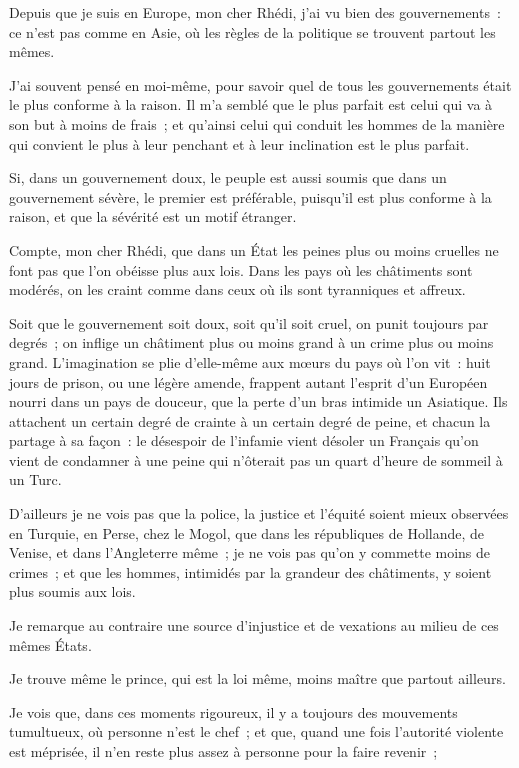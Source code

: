 \documentclass[french,twoside]{book} %
\begin{document}
\noindent Depuis que je suis en Europe, mon cher Rhédi, j’ai vu bien des gouvernements : ce n’est pas comme en Asie, où les règles de la politique se trouvent partout les mêmes.\par
J’ai souvent pensé en moi-même, pour savoir quel de tous les gouvernements était le plus conforme à la raison. Il m’a semblé que le plus parfait est celui qui va à son but à moins de frais ; et qu’ainsi celui qui conduit les hommes de la manière qui convient le plus à leur penchant et à leur inclination est le plus parfait.\par
Si, dans un gouvernement doux, le peuple est aussi soumis que dans un gouvernement sévère, le premier est préférable, puisqu’il est plus conforme à la raison, et que la sévérité est un motif étranger.\par
Compte, mon cher Rhédi, que dans un État les peines plus ou moins cruelles ne font pas que l’on obéisse plus aux lois. Dans les pays où les châtiments sont modérés, on les craint comme dans ceux où ils sont tyranniques et affreux.\par
Soit que le gouvernement soit doux, soit qu’il soit cruel, on punit toujours par degrés ; on inflige un châtiment plus ou moins grand à un crime plus ou moins grand. L’imagination se plie d’elle-même aux mœurs du pays où l’on vit : huit jours de prison, ou une légère amende, frappent autant l’esprit d’un Européen nourri dans un pays de douceur, que la perte d’un bras intimide un Asiatique. Ils attachent un certain degré de crainte à un certain degré de peine, et chacun la partage à sa façon : le désespoir de l’infamie vient désoler un Français qu’on vient de condamner à une peine qui n’ôterait pas un quart d’heure de sommeil à un Turc.\par
D’ailleurs je ne vois pas que la police, la justice et l’équité soient mieux observées en Turquie, en Perse, chez le Mogol, que dans les républiques de Hollande, de Venise, et dans l’Angleterre même ; je ne vois pas qu’on y commette moins de crimes ; et que les hommes, intimidés par la grandeur des châtiments, y soient plus soumis aux lois.\par
Je remarque au contraire une source d’injustice et de vexations au milieu de ces mêmes États.\par
Je trouve même le prince, qui est la loi même, moins maître que partout ailleurs.\par
Je vois que, dans ces moments rigoureux, il y a toujours des mouvements tumultueux, où personne n’est le chef ; et que, quand une fois l’autorité violente est méprisée, il n’en reste plus assez à personne pour la faire revenir ;\par
\end{document}
